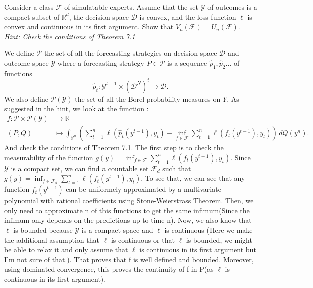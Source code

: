 \begin{exercise}[]{}
	Consider a class $ \mathcal{F} $ of simulatable experts. Assume that the set $ \mathcal{Y} $ of outcomes is a compact subset of $ \mathbb{R}^d $, the decision space $  \mathcal{D} $ is convex, and the loss function $ \ell $ is convex and continuous in its first argument. Show that $ V_n(\mathcal{F}) = U_n(\mathcal{F}) $. \it{Hint:} Check the conditions of Theorem 7.1
\end{exercise}

\begin{solution}[]
	We define $ \mathcal{P} $ the set of all the forecasting strategies on decision space $ \mathcal{D} $ and outcome space $ \mathcal{Y} $ where a forecasting strategy $ P\in \mathcal{P} $ is a sequence $ \hat{p}_1,\hat{p}_2\ldots $ of functions
\begin{equation*}
		\hat{p}_t: \mathcal{Y}^{t-1}\times (\mathcal{D}^{N})^{t}\rightarrow \mathcal{D} .
\end{equation*}
We also define $ \mathcal{P}(\mathcal{Y}) $ the set of all the Borel probability measures on $ Y $.
	As suggested in the hint, we look at the function :
\begin{align*}
f: \mathcal{P}\times \mathcal{P}(\mathcal{Y})& \longrightarrow \mathbb{R} \\
(P,Q)&\longmapsto \int_{\mathcal{Y}^{n}}\left( \sum_{t=1}^{n}\ell(\hat{p}_t(y^{t-1}),y_t) - \inf_{f\in \mathcal{F}}\sum_{t=1}^{n}\ell(f_t(y^{t-1}),y_t) \right) \,dQ(y^{n}) .
\end{align*}
And check the conditions of Theorem 7.1. The first step is to check the measurability of the function $ g(y) =  \inf_{f\in \mathcal{F}}\sum_{t=1}^{n}\ell(f_t(y^{t-1}),y_t)$. Since $ \mathcal{Y} $ is a compact set, we can find a countable set $ \mathcal{F}_d $ such that $ g(y) =\inf_{f\in \mathcal{F}_d}\sum_{t=1}^{n}\ell(f_t(y^{t-1}),y_t) $. To see that, we can see that any function $ f_t(y^{t-1}) $ can be uniformely approximated by a multivariate polynomial with rational coefficients using Stone-Weierstrass Theorem. Then, we only need to approximate n of this functions to get the same infimum(Since the infimum only depends on the predictions up to time n). Now, we also know that $ \ell $ is bounded because $ \mathcal{Y} $ is a compact space and $ \ell $ is continuous (Here we make the additional assumption that $ \ell $ is continuous or that $ \ell $ is bounded, we might be able to relax it and only assume that $ \ell $ is continuous in its first argument but I'm not sure of that.). That proves that f is well defined and bounded. Moreover, using dominated convergence, this proves the continuity of f in P(as $ \ell $ is continuous in its first argument).

\end{solution}
